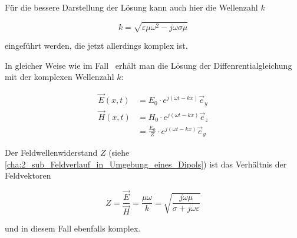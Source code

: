 Für die bessere Darstellung der Lösung kann auch hier die Wellenzahl $k$ 

\begin{equation}
    k = \sqrt{\varepsilon \mu \omega^2 - j \omega \sigma \mu}
\end{equation}

eingeführt werden, die jetzt allerdings komplex ist. \par
In gleicher Weise wie im Fall~ erhält man die Lösung der Diffenrentialgleichung~\cite{Methoden_physikalischer_Mathematik_Band_2} mit der komplexen Wellenzahl $k$:

\begin{subequations}
    \begin{align}
        \vec E(x,t) &= E_0 \cdot e^{j (\omega t - k x)} \vec e_y \\
        \vec H(x,t) &= H_0 \cdot e^{j (\omega t - k x)} \vec e_z \nonumber \\
                    &= \frac{E_0}{Z} \cdot e^{j (\omega t - k x)} \vec e_y
    \end{align}
    \label{eq:A_Wellengleichungen_mit_Leitfaehigkeit}
\end{subequations}

Der Feldwellenwiderstand $Z$ (siehe \Abschnitt \ref{cha:2_sub_Feldverlauf_in_Umgebung_eines_Dipols}) ist das Verhältnis der Feldvektoren

\begin{equation}
    Z = \frac{\vec E}{\vec H} = \frac{\mu \omega}{k} = \sqrt{\frac{j \omega \mu}{\sigma + j \omega \varepsilon}}
\end{equation}

und in diesem Fall ebenfalls komplex.




